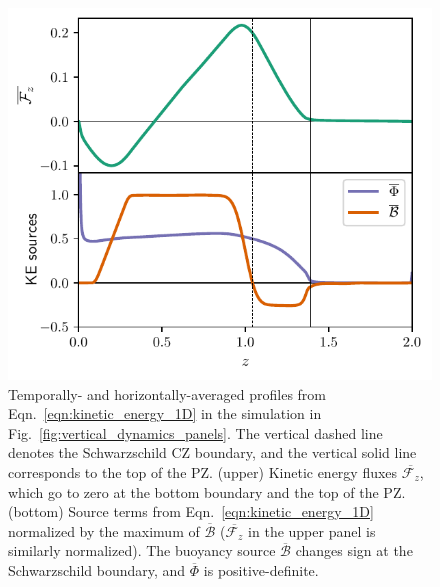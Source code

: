 \documentclass[twocolumn, linenumbers]{aastex631}
\renewcommand{\bar}[1]{\overline{#1}}
\newcommand{\editone}[1]{#1}
\begin{document}
\begin{figure}[t!]
\centering
\includegraphics[width=\columnwidth]{theory_profiles.pdf}
\caption{
Temporally- and horizontally-averaged profiles from Eqn.~\ref{eqn:kinetic_energy_1D} in the simulation in Fig.~\ref{fig:vertical_dynamics_panels}.
The vertical dashed line denotes the Schwarzschild CZ boundary, and the vertical solid line corresponds to the top of the PZ.
(upper) Kinetic energy fluxes $\bar{\mathcal{F}_{\editone{z}}}$, which go to zero at the bottom boundary and the top of the PZ.
    (bottom) Source terms from Eqn.~\ref{eqn:kinetic_energy_1D} normalized by the maximum of $\overline{\mathcal{B}}$ ($\bar{\mathcal{F}_{\editone{z}}}$ in the upper panel is similarly normalized).
The buoyancy source $\bar{\mathcal{B}}$ changes sign at the Schwarzschild boundary, and $\bar{\Phi}$ is positive-definite.
\label{fig:theory_profiles}
}
\end{figure}
\end{document}
